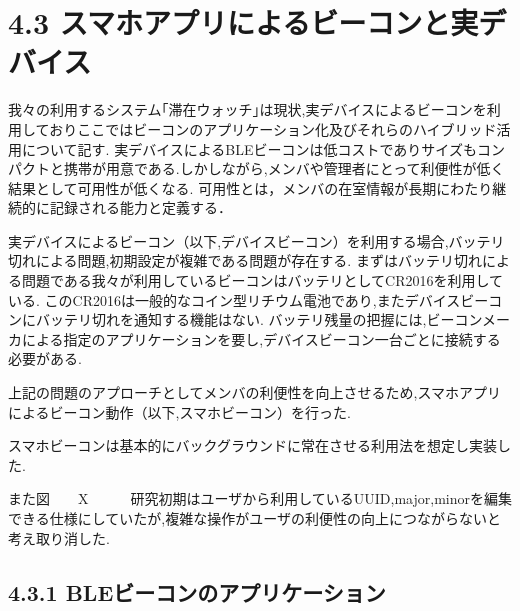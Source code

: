 \section*{4.3 スマホアプリによるビーコンと実デバイス}
 我々の利用するシステム｢滞在ウォッチ｣は現状,実デバイスによるビーコンを利用しておりここではビーコンのアプリケーション化及びそれらのハイブリッド活用について記す.
 実デバイスによるBLEビーコンは低コストでありサイズもコンパクトと携帯が用意である.しかしながら,メンバや管理者にとって利便性が低く結果として可用性が低くなる.
 可用性とは，メンバの在室情報が長期にわたり継続的に記録される能力と定義する．
 
 実デバイスによるビーコン（以下,デバイスビーコン）を利用する場合,バッテリ切れによる問題,初期設定が複雑である問題が存在する.
まずはバッテリ切れによる問題である我々が利用しているビーコンはバッテリとしてCR2016を利用している.
このCR2016は一般的なコイン型リチウム電池であり,またデバイスビーコンにバッテリ切れを通知する機能はない.
バッテリ残量の把握には,ビーコンメーカによる指定のアプリケーションを要し,デバイスビーコン一台ごとに接続する必要がある.

上記の問題のアプローチとしてメンバの利便性を向上させるため,スマホアプリによるビーコン動作（以下,スマホビーコン）を行った.

スマホビーコンは基本的にバックグラウンドに常在させる利用法を想定し実装した.

また図　　X　　　研究初期はユーザから利用しているUUID,major,minorを編集できる仕様にしていたが,複雑な操作がユーザの利便性の向上につながらないと考え取り消した.




\subsection*{4.3.1 BLEビーコンのアプリケーション}